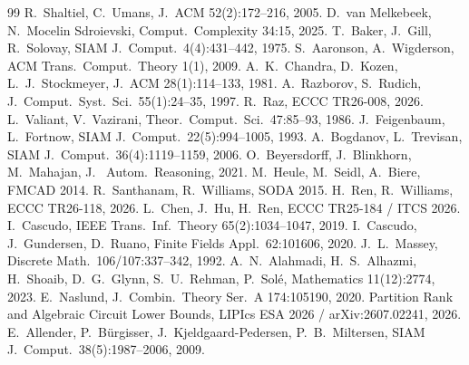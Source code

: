 \documentclass[11pt]{article}
\begin{document}
\begin{thebibliography}{99}
 R.~Shaltiel, C.~Umans, J.~ACM 52(2):172--216, 2005.
 D.~van Melkebeek, N.~Mocelin Sdroievski, Comput.\ Complexity 34:15, 2025.
 T.~Baker, J.~Gill, R.~Solovay, SIAM J.\ Comput.\ 4(4):431--442, 1975.
 S.~Aaronson, A.~Wigderson, ACM Trans.\ Comput.\ Theory 1(1), 2009.
 A.~K.~Chandra, D.~Kozen, L.~J.~Stockmeyer, J.~ACM 28(1):114--133, 1981.
 A.~Razborov, S.~Rudich, J.\ Comput.\ Syst.\ Sci.\ 55(1):24--35, 1997.
 R.~Raz, ECCC TR26-008, 2026.
 L.~Valiant, V.~Vazirani, Theor.\ Comput.\ Sci.\ 47:85--93, 1986.
 J.~Feigenbaum, L.~Fortnow, SIAM J.\ Comput.\ 22(5):994--1005, 1993.
 A.~Bogdanov, L.~Trevisan, SIAM J.\ Comput.\ 36(4):1119--1159, 2006.
 O.~Beyersdorff, J.~Blinkhorn, M.~Mahajan, J.~ Autom.\ Reasoning, 2021.
 M.~Heule, M.~Seidl, A.~Biere, FMCAD 2014.
 R.~Santhanam, R.~Williams, SODA 2015.
 H.~Ren, R.~Williams, ECCC TR26-118, 2026.
 L.~Chen, J.~Hu, H.~Ren, ECCC TR25-184 / ITCS 2026.
 I.~Cascudo, IEEE Trans.\ Inf.\ Theory 65(2):1034--1047, 2019.
 I.~Cascudo, J.~Gundersen, D.~Ruano, Finite Fields Appl.\ 62:101606, 2020.
 J.~L.~Massey, Discrete Math.\ 106/107:337--342, 1992.
 A.~N.~Alahmadi, H.~S.~Alhazmi, H.~Shoaib, D.~G.~Glynn, S.~U.~Rehman, P.~Sol\'e,
Mathematics 11(12):2774, 2023.
 E.~Naslund, J.\ Combin.\ Theory Ser.\ A 174:105190, 2020.
 Partition Rank and Algebraic Circuit Lower Bounds, LIPIcs ESA 2026 /
arXiv:2607.02241, 2026.
 E.~Allender, P.~B\"urgisser, J.~Kjeldgaard-Pedersen, P.~B.~Miltersen,
SIAM J.\ Comput.\ 38(5):1987--2006, 2009.
\end{thebibliography}

\end{document}
